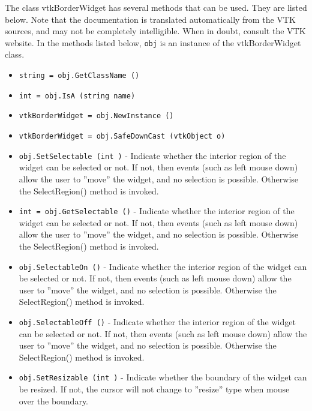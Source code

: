 The class vtkBorderWidget has several methods that can be used.
  They are listed below.
Note that the documentation is translated automatically from the VTK sources,
and may not be completely intelligible.  When in doubt, consult the VTK website.
In the methods listed below, \verb|obj| is an instance of the vtkBorderWidget class.
\begin{itemize}
\item  \verb|string = obj.GetClassName ()|

\item  \verb|int = obj.IsA (string name)|

\item  \verb|vtkBorderWidget = obj.NewInstance ()|

\item  \verb|vtkBorderWidget = obj.SafeDownCast (vtkObject o)|

\item  \verb|obj.SetSelectable (int )| -  Indicate whether the interior region of the widget can be selected or
 not. If not, then events (such as left mouse down) allow the user to
 ''move'' the widget, and no selection is possible. Otherwise the
 SelectRegion() method is invoked.

\item  \verb|int = obj.GetSelectable ()| -  Indicate whether the interior region of the widget can be selected or
 not. If not, then events (such as left mouse down) allow the user to
 ''move'' the widget, and no selection is possible. Otherwise the
 SelectRegion() method is invoked.

\item  \verb|obj.SelectableOn ()| -  Indicate whether the interior region of the widget can be selected or
 not. If not, then events (such as left mouse down) allow the user to
 ''move'' the widget, and no selection is possible. Otherwise the
 SelectRegion() method is invoked.

\item  \verb|obj.SelectableOff ()| -  Indicate whether the interior region of the widget can be selected or
 not. If not, then events (such as left mouse down) allow the user to
 ''move'' the widget, and no selection is possible. Otherwise the
 SelectRegion() method is invoked.

\item  \verb|obj.SetResizable (int )| -  Indicate whether the boundary of the widget can be resized.
 If not, the cursor will not change to ''resize'' type when mouse
 over the boundary.


\end{itemize}

